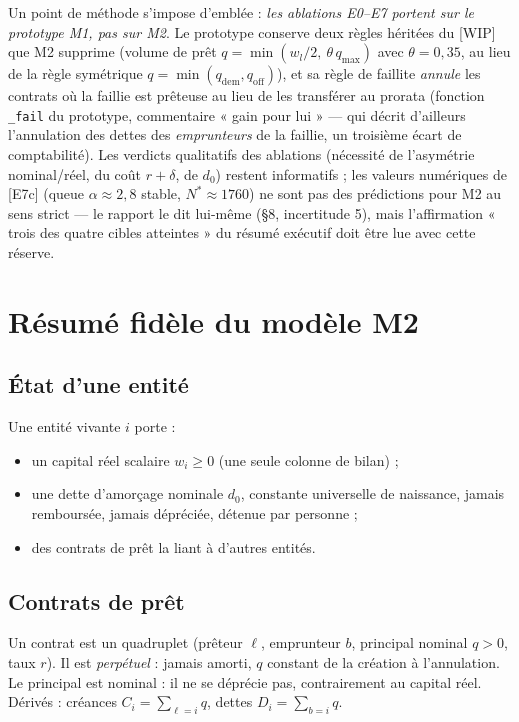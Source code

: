 \documentclass[11pt,a4paper]{article}
\begin{document}
Un point de méthode s'impose d'emblée : \emph{les ablations E0--E7 portent sur
le prototype M1, pas sur M2}. Le prototype conserve deux règles héritées du
[WIP] que M2 supprime (volume de prêt $q = \min(w_l/2,\ \theta\, q_{\max})$
avec $\theta = 0{,}35$, au lieu de la règle symétrique
$q = \min(q_{\mathrm{dem}}, q_{\mathrm{off}})$), et sa règle de faillite
\emph{annule} les contrats où la faillie est prêteuse au lieu de les
transférer au prorata (fonction \texttt{\_fail} du prototype, commentaire
« gain pour lui » — qui décrit d'ailleurs l'annulation des dettes des
\emph{emprunteurs} de la faillie, un troisième écart de comptabilité).
Les verdicts qualitatifs des ablations (nécessité de l'asymétrie
nominal/réel, du coût $r+\delta$, de $d_0$) restent informatifs ; les valeurs
numériques de [E7c] (queue $\alpha \approx 2{,}8$ stable, $N^* \approx 1760$)
ne sont pas des prédictions pour M2 au sens strict — le rapport le dit
lui-même (§8, incertitude 5), mais l'affirmation « trois des quatre cibles
atteintes » du résumé exécutif doit être lue avec cette réserve.

\section{Résumé fidèle du modèle M2}
\label{sec:resume}

\subsection{État d'une entité}
Une entité vivante $i$ porte :
\begin{itemize}[nosep]
\item un capital réel scalaire $w_i \ge 0$ (une seule colonne de bilan) ;
\item une dette d'amorçage nominale $d_0$, constante universelle de naissance,
  jamais remboursée, jamais dépréciée, détenue par personne ;
\item des contrats de prêt la liant à d'autres entités.
\end{itemize}

\subsection{Contrats de prêt}
Un contrat est un quadruplet (prêteur $\ell$, emprunteur $b$, principal
nominal $q > 0$, taux $r$). Il est \emph{perpétuel} : jamais amorti, $q$
constant de la création à l'annulation. Le principal est nominal : il ne se
déprécie pas, contrairement au capital réel. Dérivés : créances
$C_i = \sum_{\ell = i} q$, dettes $D_i = \sum_{b = i} q$.
\end{document}
